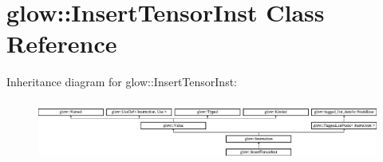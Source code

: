 \hypertarget{classglow_1_1_insert_tensor_inst}{}\section{glow\+:\+:Insert\+Tensor\+Inst Class Reference}
\label{classglow_1_1_insert_tensor_inst}
Inheritance diagram for glow\+:\+:Insert\+Tensor\+Inst\+:\begin{figure}[H]
\begin{center}
\leavevmode
\includegraphics[height=1.991111cm]{classglow_1_1_insert_tensor_inst}
\end{center}
\end{figure}
